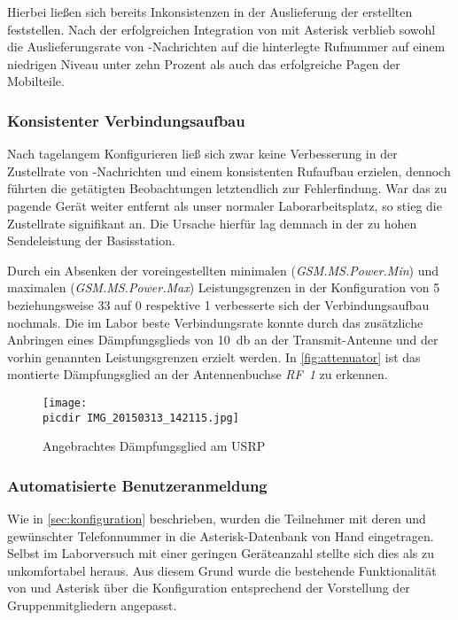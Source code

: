 Hierbei ließen sich bereits Inkonsistenzen in der Auslieferung der erstellten \SMS feststellen. Nach der erfolgreichen Integration von \OpenBTS mit Asterisk verblieb sowohl die Auslieferungsrate von \SMS-Nachrichten auf die hinterlegte Rufnummer auf einem niedrigen Niveau unter zehn Prozent als auch das erfolgreiche Pagen der Mobilteile.
\subsubsection{Konsistenter Verbindungsaufbau}
Nach tagelangem Konfigurieren ließ sich zwar keine Verbesserung in der Zustellrate von \SMS-Nachrichten und einem konsistenten Rufaufbau erzielen, dennoch führten die getätigten Beobachtungen letztendlich zur Fehlerfindung. War das zu pagende Gerät weiter entfernt als unser normaler Laborarbeitsplatz, so stieg die Zustellrate signifikant an.
Die Ursache hierfür lag demnach in der zu hohen Sendeleistung der Basisstation.

Durch ein Absenken der voreingestellten minimalen (\emph{GSM.MS.Power.Min}) und maximalen (\emph{GSM.MS.Power.Max}) Leistungsgrenzen in der Konfiguration von \SI{5}{\dBm} beziehungsweise \SI{33}{\dBm} auf \SI{0}{\dBm} respektive \SI{1}{\dBm} verbesserte sich der Verbindungsaufbau nochmals. 
Die im Labor beste Verbindungsrate konnte durch das zusätzliche Anbringen eines Dämpfungsglieds von \SI{10}{\decibel} an der Transmit-Antenne und der vorhin genannten Leistungsgrenzen erzielt werden. 
In \autoref{fig:attenuator} ist das montierte Dämpfungsglied an der Antennenbuchse \emph{RF~1} zu erkennen.

\begin{figure}[h!]
	\centering
	\texttt{[image: \\picdir IMG\_20150313\_142115.jpg]}
	\caption{Angebrachtes Dämpfungsglied am \acs*{USRP}}
	\label{fig:attenuator}
\end{figure}


\subsubsection{Automatisierte Benutzeranmeldung}
Wie in \autoref{sec:konfiguration} beschrieben, wurden die Teilnehmer mit deren \IMSI und gewünschter Telefonnummer in die Asterisk-Datenbank von Hand eingetragen. Selbst im Laborversuch mit einer geringen Geräteanzahl stellte sich dies als zu unkomfortabel heraus.
Aus diesem Grund wurde die bestehende Funktionalität von \OpenBTS und Asterisk über die Konfiguration entsprechend der Vorstellung der Gruppenmitgliedern angepasst.

